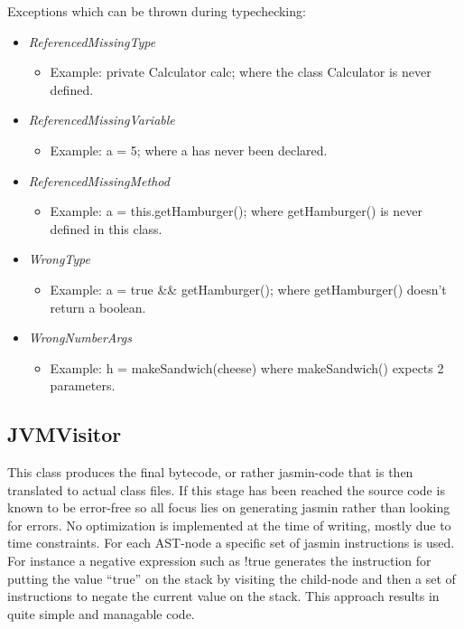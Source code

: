 \documentclass[paper=a4, fontsize=11pt]{scrartcl} %
\numberwithin{equation}{section} %
\numberwithin{figure}{section} %
\numberwithin{table}{section} %
\begin{document}
Exceptions which can be thrown during typechecking:
\begin{itemize}
  \item{\emph{ReferencedMissingType}}
  \begin{itemize}
    \item{Example: private Calculator calc; where the class Calculator is never defined.}
  \end{itemize}
  \item{\emph{ReferencedMissingVariable}}
  \begin{itemize}
    \item{Example: a = 5; where a has never been declared.}
  \end{itemize}
  \item{\emph{ReferencedMissingMethod}}
  \begin{itemize}
    \item{Example: a = this.getHamburger(); where getHamburger() is never defined in this class.}
  \end{itemize}
  \item{\emph{WrongType}}
  \begin{itemize}
    \item{Example: a = true \&\& getHamburger(); where getHamburger() doesn’t return a boolean.}
  \end{itemize}
  \item{\emph{WrongNumberArgs}}
  \begin{itemize}
    \item{Example: h = makeSandwich(cheese) where makeSandwich() expects 2 parameters. }
  \end{itemize}
\end{itemize}

\subsection{JVMVisitor}
This class produces the final bytecode, or rather jasmin-code that is then translated to actual class files. If this stage has been reached the source code is known to be error-free so all focus lies on generating jasmin rather than looking for errors. No optimization is implemented at the time of writing, mostly due to time constraints. For each AST-node a specific set of jasmin instructions is used. For instance a negative expression such as !true generates the instruction for putting the value “true” on the stack by visiting the child-node and then a set of instructions to negate the current value on the stack. This approach results in quite simple and managable code.
\end{document}
